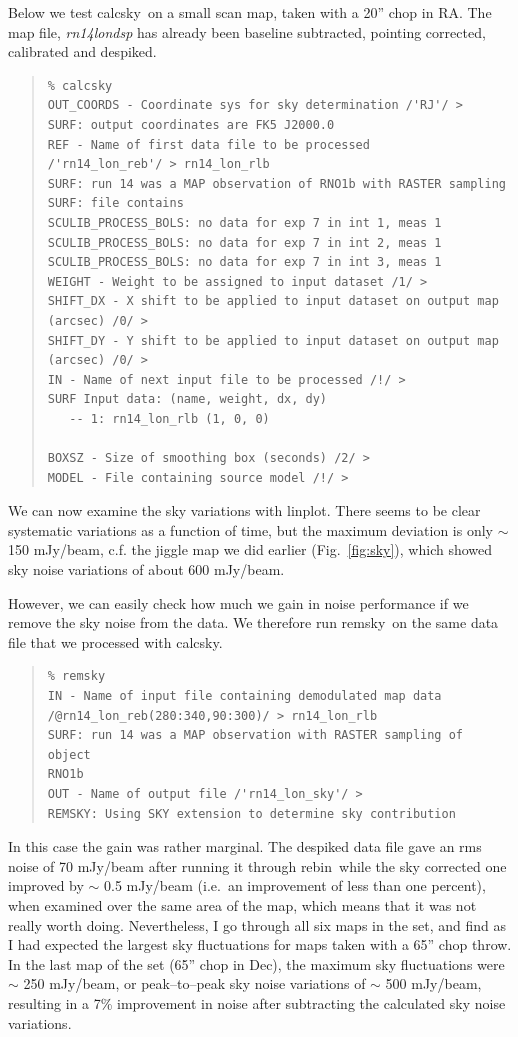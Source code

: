 \documentclass[twoside,11pt]{article}
\newenvironment{myquote}{\begin{quote}\begin{small}}{\end{small}\end{quote}}
\newcommand{\task}[1]{\textsf{#1}}
\newcommand{\rebin}{\xref{\task{rebin}}{sun216}{REBIN}}
\newcommand{\calcsky}{\xref{\task{calcsky}}{sun216}{CALCSKY}}
\newcommand{\remsky}{\xref{\task{remsky}}{sun216}{REMSKY}}
\newcommand{\linplot}{\xref{\task{linplot}}{sun95}{LINPLOT}}
\newcommand{\xref}[3]{#1}
\renewcommand{\_}{\texttt{\symbol{95}}}
\begin{document}
Below we test \calcsky\ on a small scan map, taken with a 20'' chop
in RA.  The map file, {\it rn14\_lon\_dsp} has already been baseline
subtracted, pointing corrected, calibrated and despiked.


\begin{myquote}
\begin{verbatim}
% calcsky
OUT_COORDS - Coordinate sys for sky determination /'RJ'/ > 
SURF: output coordinates are FK5 J2000.0
REF - Name of first data file to be processed 
/'rn14_lon_reb'/ > rn14_lon_rlb
SURF: run 14 was a MAP observation of RNO1b with RASTER sampling
SURF: file contains
SCULIB_PROCESS_BOLS: no data for exp 7 in int 1, meas 1
SCULIB_PROCESS_BOLS: no data for exp 7 in int 2, meas 1
SCULIB_PROCESS_BOLS: no data for exp 7 in int 3, meas 1
WEIGHT - Weight to be assigned to input dataset /1/ > 
SHIFT_DX - X shift to be applied to input dataset on output map 
(arcsec) /0/ > 
SHIFT_DY - Y shift to be applied to input dataset on output map 
(arcsec) /0/ > 
IN - Name of next input file to be processed /!/ > 
SURF Input data: (name, weight, dx, dy)
   -- 1: rn14_lon_rlb (1, 0, 0)

BOXSZ - Size of smoothing box (seconds) /2/ > 
MODEL - File containing source model /!/ > 
\end{verbatim}
\end{myquote}

We can now examine the sky variations with \linplot. There seems to be
clear systematic variations as a function of time, but the maximum
deviation is only $\sim$ 150 mJy/beam, c.f. the jiggle map we did
earlier (Fig.\ \ref{fig:sky}), which showed sky noise variations of
about 600 mJy/beam.

However, we can easily check how much we gain in noise performance if
we remove the sky noise from the data.  We therefore run \remsky\ on
the same data file that we processed with \calcsky.

\begin{myquote}
\begin{verbatim}
% remsky
IN - Name of input file containing demodulated map data 
/@rn14_lon_reb(280:340,90:300)/ > rn14_lon_rlb
SURF: run 14 was a MAP observation with RASTER sampling of object 
RNO1b
OUT - Name of output file /'rn14_lon_sky'/ > 
REMSKY: Using SKY extension to determine sky contribution
\end{verbatim}
\end{myquote}

In this case the gain was rather marginal. The despiked data file gave
an rms noise of 70 mJy/beam after running it through \rebin\, while the
sky corrected one improved by $\sim$ 0.5 mJy/beam (i.e.\ an improvement
of less than one percent), when examined over the same area of the map,
which means that it was not really worth doing. Nevertheless, I go
through all six maps in the set, and find as I had expected the largest
sky fluctuations for maps taken with a 65'' chop throw. In the last map
of the set (65'' chop in Dec), the maximum sky fluctuations were $\sim$
250 mJy/beam, or  peak--to--peak sky noise variations of $\sim$ 500
mJy/beam, resulting in a 7\% improvement in noise after subtracting the
calculated sky noise variations.
\end{document}
